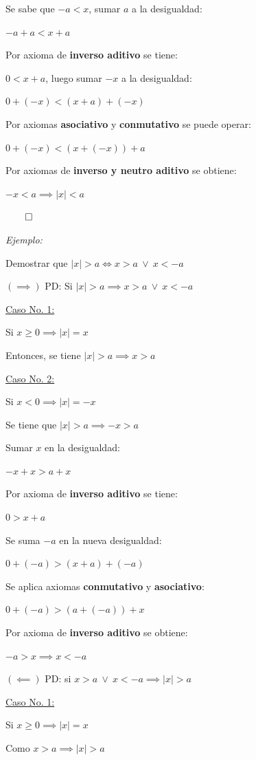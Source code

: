 \documentclass{article}
\begin{document}
Se sabe que $-a < x$, sumar $a$ a la desigualdad:

$- a + a < x + a$

Por axioma de \textbf{inverso aditivo} se tiene:

$0 < x + a$, luego sumar $-x$ a la desigualdad:

$0 + (-x) < (x + a) + (-x)$

Por axiomas \textbf{asociativo} y \textbf{conmutativo} se puede operar:

$0 + (-x) < (x + (-x)) + a$

Por axiomas de \textbf{inverso y neutro aditivo} se obtiene:

$- x < a \implies \mid x \mid < a$

$\qed$

\textit{Ejemplo:}

Demostrar que $\mid x \mid > a \iff x > a \ \lor \ x < - a$

$(\implies)$ PD: Si $\mid x \mid > a \implies x > a \ \lor \ x < -a$

\underline{Caso No. 1:}

Si $x \ge 0 \implies \mid x \mid = x$

Entonces, se tiene $\mid x \mid > a \implies x > a$

\underline{Caso No. 2:}

Si $x < 0 \implies \mid x \mid = - x$

Se tiene que $\mid x \mid > a \implies -x > a$

Sumar $x$ en la desigualdad:

$- x + x > a + x$

Por axioma de \textbf{inverso aditivo} se tiene:

$0 > x + a$

Se suma $- a$ en la nueva desigualdad:

$0 + (-a) > (x + a) + (-a)$

Se aplica axiomas \textbf{conmutativo} y \textbf{asociativo}:

$0 + (-a) > (a + (-a)) + x$

Por axioma de \textbf{inverso aditivo} se obtiene:

$-a > x \implies x < -a$

$(\impliedby)$ PD: si $x > a \ \lor \ x < - a \implies \mid x \mid > a$

\underline{Caso No. 1:}

Si $x \ge 0 \implies \mid x \mid = x$

Como $x > a \implies \mid x \mid > a$
\end{document}
